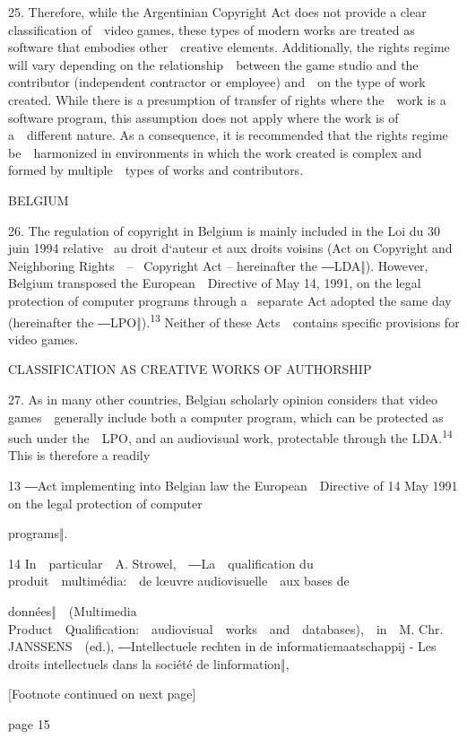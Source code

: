 \documentclass[
]{article}
\begin{document}
{25. }{Therefore, while the Argentinian }{Copyright Act }{does not
provide a clear classification of~~video games, these types of modern
works are treated as software that embodies other~~creative elements.
Additionally, the rights regime will vary depending on the
relationship~~between the game studio and the contributor (independent
contractor or employee) and~~on the type of work created. While there is
a presumption of transfer of rights where the~~work is a software
program, this assumption does not apply where the work is of
a~~different nature. As a consequence, it is recommended that the rights
regime be~~harmonized in environments in which the work created is
complex and formed by multiple~~types of works and contributors.}

{BELGIUM}

{26. }{The regulation of copyright in Belgium is mainly included in the
}{Loi du 30 juin 1994 relative }{~au droit d`auteur et aux droits
voisins }{(Act on Copyright and Neighboring Rights~~}{-- }{~Copyright
Act }{-- hereinafter the ―LDA‖)}{. However, Belgium transposed the
European~~Directive of May 14, 1991, on the legal protection of computer
programs through a }{~separate Act adopted the same day (hereinafter the
―LPO‖).}\textsuperscript{{13 }}{Neither of these Acts~~contains specific
provisions for video games.}

{CLASSIFICATION AS CREATIVE WORKS OF AUTHORSHIP}

{27. }{As in many other countries, Belgian scholarly opinion considers
that video games~~generally include both a computer program, which can
be protected as such under the~~LPO, and an audiovisual work,
protectable through the LDA.}\textsuperscript{{14 }}{This is therefore a
readily}

{13 }{―Act }{implementing into Belgian law the European~~Directive of 14
May 1991 on the legal protection of computer}

{programs}{‖}{.}

{14 }{In~~particular~~A. }{Strowel,~~―La~~qualification du
produit~~multimédia:~~de l\textquotesingle œuvre audiovisuelle~~aux
bases de}

{données‖~~(Multimedia
Product~~Qualification:~~audiovisual~~works~~and~~databases),~~in~~M}{.
Chr. JANSSENS~~(ed.), }{―Intellectuele rechten in de
informatiemaatschappij }{- Les droits intelle}{ctuels dans la société de
l\textquotesingle information‖,}

{{[}Footnote continued on next page{]}}

{page 15}
\end{document}
